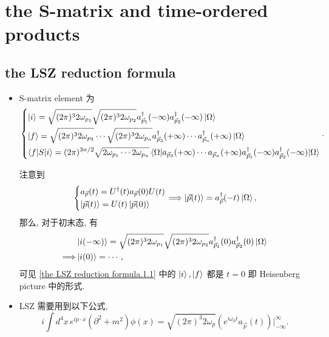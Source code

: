 \chapter{the S-matrix and time-ordered products}
\section{the LSZ reduction formula}
\begin{itemize}
	\item S-matrix element 为
	\begin{equation}\label{the LSZ reduction formula.1.1}
		\begin{dcases}
			\ket{i} = \sqrt{(2 \pi)^3 2 \omega_{p_1}} \sqrt{(2 \pi)^3 2 \omega_{p_2}} a^\dag_{\vec{p}_1}(- \infty) a^\dag_{\vec{p}_2}(- \infty) \ket{\Omega} \\
			\ket{f} = \sqrt{(2 \pi)^3 2 \omega_{p_3}} \cdots \sqrt{(2 \pi)^3 2 \omega_{p_n}} a^\dag_{\vec{p}_3}(+ \infty) \cdots a^\dag_{\vec{p}_n}(+ \infty) \ket{\Omega} \\
			\braket{f | S | i} = (2 \pi)^{3 n / 2} \sqrt{2 \omega_{p_1} \cdots 2 \omega_{p_n}} \braket{\Omega | a_{\vec{p}_3}(+ \infty) \cdots a_{\vec{p}_n}(+ \infty) a^\dag_{\vec{p}_1}(- \infty) a^\dag_{\vec{p}_2}(- \infty) | \Omega}
		\end{dcases}.
	\end{equation}
	
	\begin{tcolorbox}[title=remark:]
		注意到
		\begin{equation}
			\begin{dcases}
				a_{\vec{p}}(t) = U^\dag(t) a_{\vec{p}}(0) U(t) \\
				\ket{\vec{p}(t)} = U(t) \ket{\vec{p}(0)}
			\end{dcases} \Longrightarrow \ket{\vec{p}(t)} = a^\dag_{\vec{p}}(- t) \ket{\Omega},
		\end{equation}
		那么, 对于初末态, 有
		\begin{align}
			& \ket{i(- \infty)} = \sqrt{(2 \pi)^3 2 \omega_{p_1}} \sqrt{(2 \pi)^3 2 \omega_{p_2}} a^\dag_{\vec{p}_1}(0) a^\dag_{\vec{p}_2}(0) \ket{\Omega} \notag \\
			\Longrightarrow & \ket{i(0)} = \cdots,
		\end{align}
		可见 \eqref{the LSZ reduction formula.1.1} 中的 $\ket{i}, \ket{f}$ 都是 $t = 0$ 即 Heisenberg picture 中的形式.
	\end{tcolorbox}
	
	\item LSZ 需要用到以下公式,
	\begin{equation}
		i \int d^4 x \, e^{i p \cdot x} (\partial^2 + m^2) \phi(x) = \sqrt{(2 \pi)^3 2 \omega_p} (e^{i \omega_p t} a_{\vec{p}}(t)) \Big|^\infty_{- \infty}.
	\end{equation}
	

\end{itemize}
